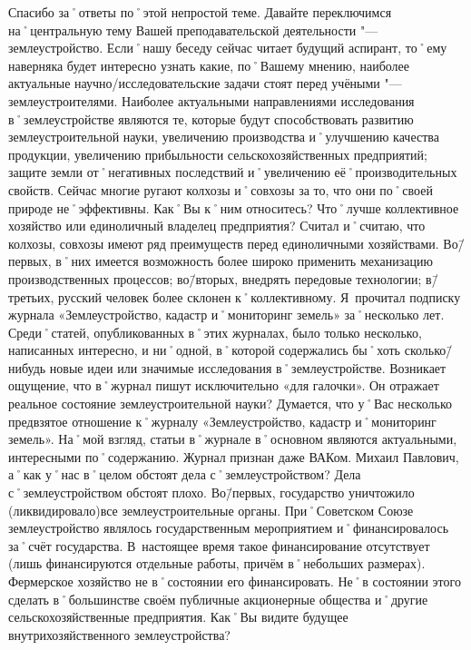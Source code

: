 \begin{drama}
	\maxspeaks Спасибо за˚ответы по˚этой непростой теме. Давайте переключимся на˚центральную тему Вашей преподавательской деятельности "--- землеустройство.
Если˚нашу беседу сейчас читает будущий аспирант, то˚ему наверняка будет интересно узнать какие, по˚Вашему мнению, наиболее актуальные научно\-/исследовательские задачи стоят перед учёными "--- землеустроителями.
	\michaelspeaks Наиболее актуальными направлениями исследования в˚землеустройстве являются те, которые будут способствовать развитию землеустроительной науки, увеличению производства и˚улучшению качества продукции, увеличению прибыльности сельскохозяйственных предприятий; защите земли от˚негативных последствий и˚увеличению её˚производительных свойств.
	\maxspeaks Сейчас многие ругают колхозы и˚совхозы за то, что они по˚своей природе не˚эффективны. Как˚Вы к˚ним относитесь? Что˚лучше коллективное хозяйство или единоличный владелец предприятия?
	\michaelspeaks Считал и˚считаю, что колхозы, совхозы имеют ряд преимуществ перед единоличными хозяйствами. Во\=/первых, в˚них имеется возможность более широко применить механизацию производственных процессов; во\=/вторых, внедрять передовые технологии; в\=/третьих, русский человек более склонен к˚коллективному.
	\maxspeaks Я~прочитал подписку журнала «Землеустройство, кадастр и˚мониторинг земель» за˚несколько лет. Среди˚статей, опубликованных в˚этих журналах, было только несколько, написанных интересно, и ни˚одной, в˚которой содержались бы˚хоть сколько\=/нибудь новые идеи или значимые исследования в˚землеустройстве. Возникает ощущение, что в˚журнал пишут исключительно  «для галочки». Он отражает реальное состояние землеустроительной науки?
	\michaelspeaks Думается, что у˚Вас несколько предвзятое отношение к˚журналу «Землеустройство, кадастр и˚мониторинг земель». На˚мой взгляд, статьи в˚журнале в˚основном являются актуальными, интересными по˚содержанию. Журнал признан даже ВАКом. 
	\maxspeaks Михаил Павлович, а˚как у˚нас в˚целом обстоят дела с˚землеустройством?
	\michaelspeaks Дела с˚землеустройством обстоят плохо. Во\=/первых, государство уничтожило (ликвидировало)все землеустроительные органы. При˚Советском Союзе землеустройство являлось государственным мероприятием и˚финансировалось за˚счёт государства. В~настоящее время такое финансирование отсутствует (лишь финансируются отдельные работы, причём в˚небольших размерах). Фермерское хозяйство не в˚состоянии его финансировать. Не˚в состоянии этого сделать в˚большинстве своём публичные акционерные общества и˚другие сельскохозяйственные предприятия.
	\maxspeaks Как˚Вы видите будущее внутрихозяйственного землеустройства?

\end{drama}
